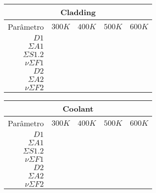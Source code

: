\begin{tabular}{r l l l l}
  \multicolumn{5}{c}{Cladding} \\
  \hline
  Parâmetro & $300K$ & $400K$ & $500K$ & $600K$ \\
  \hline
  $D1$ & & & & \\
  $\Sigma A1$ & & & & \\
  $\Sigma S1.2$ & & & & \\
  $\nu \Sigma F1$ & & & & \\
  \hline
  $D2$ & & & & \\
  $\Sigma A2$ & & & & \\
  $\nu \Sigma F2$ & & & & \\
  \hline
\end{tabular}

\begin{tabular}{r l l l l}
  \multicolumn{5}{c}{Coolant} \\
  \hline
  Parâmetro & $300K$ & $400K$ & $500K$ & $600K$ \\
  \hline
  $D1$ & & & & \\
  $\Sigma A1$ & & & & \\
  $\Sigma S1.2$ & & & & \\
  $\nu \Sigma F1$ & & & & \\
  \hline
  $D2$ & & & & \\
  $\Sigma A2$ & & & & \\
  $\nu \Sigma F2$ & & & & \\
  \hline
\end{tabular}
